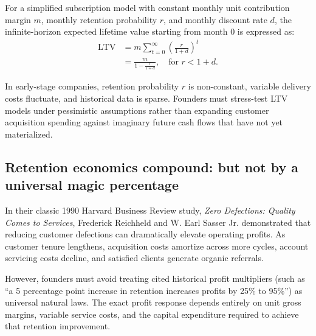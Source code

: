 For a simplified subscription model with constant monthly unit contribution margin $m$, monthly retention probability $r$, and monthly discount rate $d$, the infinite-horizon expected lifetime value starting from month 0 is expressed as:
\begin{equation}
\begin{aligned}
\text{LTV} &= m \sum_{t=0}^{\infty} \left( \frac{r}{1+d} \right)^t \\
&= \frac{m}{1 - \frac{r}{1+d}}, \quad \text{for } r < 1+d.
\end{aligned}
\end{equation}

In early-stage companies, retention probability $r$ is non-constant, variable delivery costs fluctuate, and historical data is sparse. Founders must stress-test LTV models under pessimistic assumptions rather than expanding customer acquisition spending against imaginary future cash flows that have not yet materialized.

\subsection{Retention economics compound: but not by a universal magic percentage}

In their classic 1990 Harvard Business Review study, \textit{Zero Defections: Quality Comes to Services}, Frederick Reichheld and W. Earl Sasser Jr. demonstrated that reducing customer defections can dramatically elevate operating profits. As customer tenure lengthens, acquisition costs amortize across more cycles, account servicing costs decline, and satisfied clients generate organic referrals.

However, founders must avoid treating cited historical profit multipliers (such as ``a 5 percentage point increase in retention increases profits by 25\% to 95\%'') as universal natural laws. The exact profit response depends entirely on unit gross margins, variable service costs, and the capital expenditure required to achieve that retention improvement.


